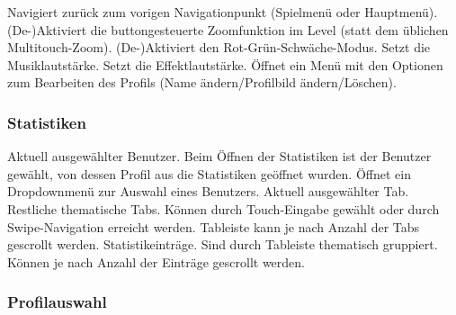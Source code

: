 \begin{requirements}
 Navigiert zurück zum vorigen Navigationpunkt (Spielmenü oder Hauptmenü).
 (De-)Aktiviert die buttongesteuerte Zoomfunktion im Level (statt dem üblichen Multitouch-Zoom).
 (De-)Aktiviert den Rot-Grün-Schwäche-Modus.
 Setzt die Musiklautstärke.
 Setzt die Effektlautstärke.
 Öffnet ein Menü mit den Optionen zum Bearbeiten des Profils (Name ändern/Profilbild ändern/Löschen).
\end{requirements}

\subsubsection{Statistiken}

\begin{center}
\setlength\fboxsep{20pt}
\setlength\fboxrule{1pt}
\end{center}

\begin{requirements}
 Aktuell ausgewählter Benutzer. Beim Öffnen der Statistiken ist der Benutzer gewählt, von dessen Profil aus die Statistiken geöffnet wurden. Öffnet ein Dropdownmenü zur Auswahl eines Benutzers.
 Aktuell ausgewählter Tab.
 Restliche thematische Tabs. Können durch Touch-Eingabe gewählt oder durch Swipe-Navigation erreicht werden. Tableiste kann je nach Anzahl der Tabs gescrollt werden.
 Statistikeinträge. Sind durch Tableiste thematisch gruppiert. Können je nach Anzahl der Einträge gescrollt werden.
\end{requirements}

\subsubsection{Profilauswahl}

